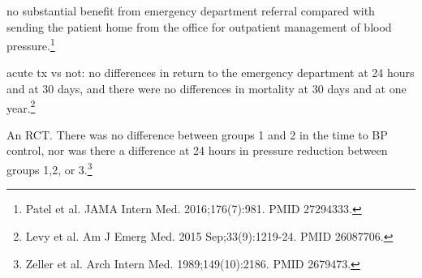 \documentclass{tufte-handout}
\begin{document}
no substantial benefit from emergency department referral compared
with sending the patient home from the office for outpatient
management of blood pressure.\footnote{Patel et al. JAMA Intern Med. 2016;176(7):981. PMID
27294333.}

acute tx vs not: no differences in return to the emergency department
at 24 hours and at 30 days, and there were no differences in mortality
at 30 days and at one year.\footnote{Levy et al. Am J Emerg Med. 2015 Sep;33(9):1219-24.  PMID
26087706.}

An RCT.  There was no difference between groups 1 and 2 in the time to
BP control, nor was there a difference at 24 hours in pressure
reduction between groups 1,2, or 3.\footnote{Zeller et al. Arch Intern Med. 1989;149(10):2186. PMID 2679473.}
\end{document}
